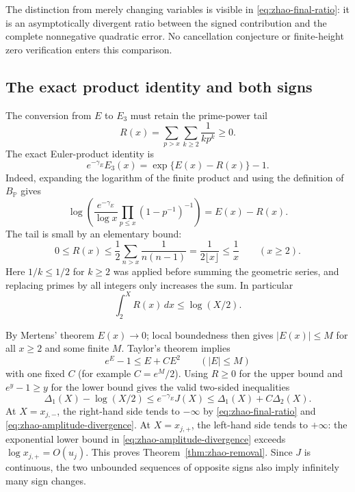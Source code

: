 \documentclass[11pt,a4paper]{article}
\numberwithin{equation}{section}
\theoremstyle{definition}\newtheorem{definition}[theorem]{Definition}
\theoremstyle{remark}\newtheorem{remark}[theorem]{Remark}
\begin{document}
The distinction from merely changing variables is visible in
\eqref{eq:zhao-final-ratio}: it is an asymptotically divergent ratio
between the signed contribution and the complete nonnegative
quadratic error. No cancellation conjecture or finite-height zero
verification enters this comparison.

\subsection{The exact product identity and both signs}

The conversion from $E$ to $E_3$ must retain the prime-power tail
\begin{equation}
 \label{eq:zhao-product-tail}
 R(x)=\sum_{p>x}\sum_{k\geq2}\frac{1}{kp^k}\geq0.
\end{equation}
The exact Euler-product identity is
\begin{equation}
 \label{eq:zhao-exact-product}
 e^{-\gamma_E}E_3(x)=\exp\{E(x)-R(x)\}-1.
\end{equation}
Indeed, expanding the logarithm of the finite product and using the
definition of $B_{\mathbb P}$ gives
\[
 \log\left(\frac{e^{-\gamma_E}}{\log x}
             \prod_{p\leq x}(1-p^{-1})^{-1}\right)=E(x)-R(x).
\]
The tail is small by an elementary bound:
\begin{equation}
 \label{eq:zhao-tail-bound}
 0\leq R(x)\leq
 \frac12\sum_{n>x}\frac1{n(n-1)}
 =\frac{1}{2\lfloor x\rfloor}\leq\frac1x
 \qquad(x\geq2).
\end{equation}
Here $1/k\leq1/2$ for $k\geq2$ was applied before summing
the geometric series, and replacing primes by all integers only
increases the sum. In particular
\begin{equation}
 \label{eq:zhao-tail-integral}
 \int_2^X R(x)\,dx\leq\log(X/2).
\end{equation}

By Mertens' theorem $E(x)\to0$; local boundedness then gives
$|E(x)|\leq M$ for all $x\geq2$ and some finite $M$.
Taylor's theorem implies
\[
 e^E-1\leq E+C E^2\qquad(|E|\leq M)
\]
with one fixed $C$ (for example $C=e^M/2$).
Using $R\geq0$ for the upper bound and $e^y-1\geq y$ for
the lower bound gives the valid two-sided inequalities
\begin{equation}
 \label{eq:zhao-exact-mean-sandwich}
 \Delta_1(X)-\log(X/2)
 \leq e^{-\gamma_E}J(X)
 \leq\Delta_1(X)+C\Delta_2(X).
\end{equation}
At $X=x_{j,-}$, the right-hand side tends to $-\infty$ by
\eqref{eq:zhao-final-ratio} and
\eqref{eq:zhao-amplitude-divergence}. At $X=x_{j,+}$, the
left-hand side tends to $+\infty$: the exponential lower bound
in \eqref{eq:zhao-amplitude-divergence} exceeds
$\log x_{j,+}=O(u_j)$. This proves
Theorem~\ref{thm:zhao-removal}. Since $J$ is continuous, the two
unbounded sequences of opposite signs also imply infinitely many
sign changes.
\end{document}
